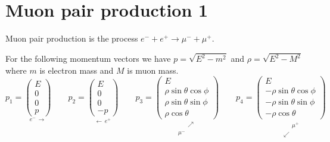 

\section*{Muon pair production 1}

Muon pair production is the process $e^-+e^+\rightarrow\mu^-+\mu^+$.

\begin{center}
\end{center}

For the following momentum vectors we have
$p=\sqrt{E^2-m^2}$ and $\rho=\sqrt{E^2-M^2}$
where $m$ is electron mass and $M$ is muon mass.
\begin{equation*}
p_1=\underset{e^- \, \longrightarrow}
{\begin{pmatrix}E\\0\\0\\p\end{pmatrix}}
\qquad
p_2=\underset{\longleftarrow \, e^+}
{\begin{pmatrix}E\\0\\0\\-p\end{pmatrix}}
\qquad
p_3=\underset{\substack{\phantom{\mu^-} \, \nearrow\\\mu^- \, \phantom{\nearrow}}}
{\begin{pmatrix}
E\\
\rho\sin\theta\cos\phi\\
\rho\sin\theta\sin\phi\\
\rho\cos\theta
\end{pmatrix}}
\qquad
p_4=
\underset{\substack{\phantom{\swarrow} \, \mu^+\\\swarrow \, \phantom{\mu^+}}}
{\begin{pmatrix}
E\\
-\rho\sin\theta\cos\phi\\
-\rho\sin\theta\sin\phi\\
-\rho\cos\theta
\end{pmatrix}}
\end{equation*}

